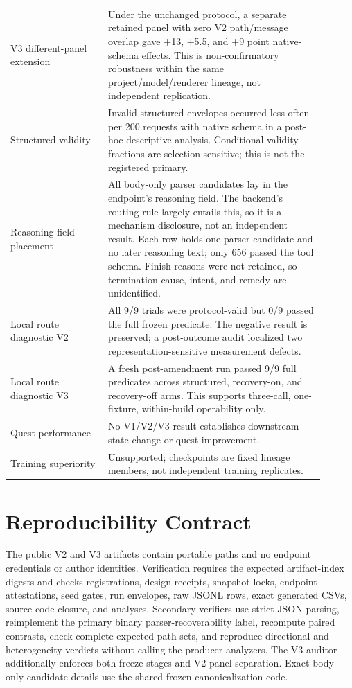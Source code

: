 \documentclass[10pt]{article}
\begin{document}
\begin{table}[H]
\begin{tabular}{>{\raggedright\arraybackslash}p{0.28\linewidth}
                >{\raggedright\arraybackslash}p{0.62\linewidth}}
V3 different-panel extension & Under the unchanged protocol, a separate
retained panel with zero V2 path/message overlap gave +13, +5.5, and +9 point
native-schema effects. This is non-confirmatory robustness within the same
project/model/renderer lineage, not independent replication. \\
Structured validity & Invalid structured envelopes occurred less often per 200
requests with native schema in a post-hoc descriptive analysis. Conditional
validity fractions are selection-sensitive; this is not the registered primary. \\
Reasoning-field placement & All \SpanRecoveredCalls{} body-only parser candidates lay in
the endpoint's reasoning field. The backend's routing rule largely entails
this, so it is a mechanism disclosure, not an independent result. Each row
holds one parser candidate and no later reasoning text; only 656 passed the
tool schema. Finish reasons were not retained, so termination cause, intent,
and remedy are unidentified. \\
Local route diagnostic V2 & All 9/9 trials were protocol-valid but 0/9 passed
the full frozen predicate. The negative result is preserved; a post-outcome
audit localized two representation-sensitive measurement defects. \\
Local route diagnostic V3 & A fresh post-amendment run passed 9/9 full
predicates across structured, recovery-on, and recovery-off arms. This supports
three-call, one-fixture, within-build operability only. \\
Quest performance & No V1/V2/V3 result establishes downstream state change or
quest improvement. \\
Training superiority & Unsupported; checkpoints are fixed lineage members, not
independent training replicates. \\
\bottomrule
\end{tabular}
\end{table}

\section{Reproducibility Contract}

The public V2 and V3 artifacts contain portable paths and no endpoint
credentials or author identities. Verification requires the expected
artifact-index digests and checks registrations, design receipts, snapshot
locks, endpoint attestations, seed gates, run envelopes, raw JSONL rows, exact
generated CSVs, source-code closure, and analyses. Secondary verifiers use
strict JSON parsing, reimplement the primary binary parser-recoverability label,
recompute paired contrasts, check complete expected path sets, and reproduce
directional and heterogeneity verdicts without calling the producer analyzers.
The V3 auditor additionally enforces both freeze stages and V2-panel
separation. Exact body-only-candidate details use the shared frozen canonicalization
code.
\end{document}
